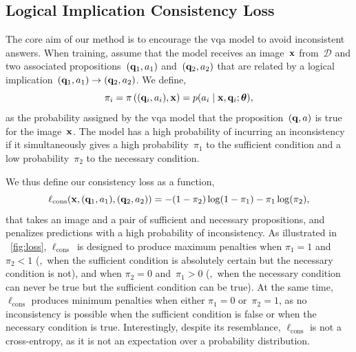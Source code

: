 
\subsection{Logical Implication Consistency Loss}
\label{subsec:loss}




The core aim of our method is to encourage the \gls{vqa} model to avoid inconsistent answers. When training, assume that the model receives an image~$\mathbf{x}$ from~$\mathcal{D}$ and two associated propositions~$(\mathbf{q}_1, a_1)$ and~$(\mathbf{q}_2, a_2)$ that are related by a logical implication~$(\mathbf{q}_1, a_1) \rightarrow (\mathbf{q}_2, a_2)$. We define,
\begin{equation}
    \pi_i=\pi \left((\mathbf{q}_i, a_i), \mathbf{x} \right) = p(a_i\mid \mathbf{x}, \mathbf{q}_i; \bm{\theta}),
\end{equation}
as the probability assigned by the \gls{vqa} model that the proposition~$(\mathbf{q}, a)$ is true for the image~$\mathbf{x}$. The model has a high probability of incurring an inconsistency if it simultaneously gives a high probability~$\pi_1$ to the sufficient condition and a low probability~$\pi_2$ to the necessary condition.

We thus define our consistency loss as a function,
\begin{equation}
    \ell_\textrm{cons}(\mathbf{x}, (\mathbf{q}_1, a_1), (\mathbf{q}_2, a_2)) = - (1-\pi_2) \log(1-\pi_1)  - \pi_1 \log(\pi_2),
\end{equation}
that takes an image and a pair of sufficient and necessary propositions, and penalizes predictions with a high probability of inconsistency. As illustrated in \fig~\ref{fig:loss}, $\ell_\textrm{cons}$~is designed to produce maximum penalties when $\pi_1=1$ and~$\pi_2<1$ (\ie,~when the sufficient condition is absolutely certain but the necessary condition is not), and when $\pi_2=0$ and~$\pi_1>0$ (\ie,~when the necessary condition can never be true but the sufficient condition can be true). At the same time, $\ell_\textrm{cons}$ produces minimum penalties when either $\pi_1=0$ or~$\pi_2=1$, as no inconsistency is possible when the sufficient condition is false or when the necessary condition is true. Interestingly, despite its resemblance, $\ell_\textrm{cons}$ is not a cross-entropy, as it is not an expectation over a probability distribution.

